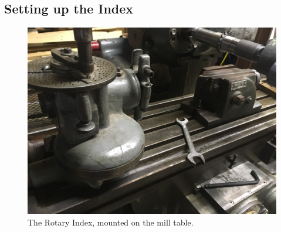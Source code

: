\documentclass[12pt,twoside,letterpaper]{article}
\begin{document}
\subsection{Setting up the Index}
\begin{figure}[H]
\centering
\includegraphics[width=5in]{indexOnMill}
	\caption{The Rotary Index, mounted on the mill table.}
\end{figure}
\end{document}
